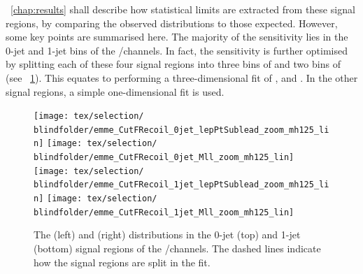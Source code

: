 \Chapter~\ref{chap:results} shall describe how statistical limits are extracted from these 
signal regions, by comparing the observed \mt distributions to those expected. However, some 
key points are summarised here. The majority of the sensitivity lies in the 0-jet and 1-jet 
bins of the \emch/\mech channels. In fact, the sensitivity is further optimised by splitting 
each of these four signal regions into three bins of \ptsubleadlep and two bins of \mll 
(see \Figure~\ref{fig:sel:df_split_sr}). This equates to performing a three-dimensional fit 
of \mt, \mll and \ptsubleadlep. In the other signal regions, a simple one-dimensional \mt 
fit is used.

\begin{figure}[p]
	\texttt{[image: tex/selection/\\blindfolder/emme\_CutFRecoil\_0jet\_lepPtSublead\_zoom\_mh125\_lin]}
	\hfill
	\texttt{[image: tex/selection/\\blindfolder/emme\_CutFRecoil\_0jet\_Mll\_zoom\_mh125\_lin]}
	\\
	\texttt{[image: tex/selection/\\blindfolder/emme\_CutFRecoil\_1jet\_lepPtSublead\_zoom\_mh125\_lin]}
	\hfill
	\texttt{[image: tex/selection/\\blindfolder/emme\_CutFRecoil\_1jet\_Mll\_zoom\_mh125\_lin]}
	\caption{The \ptsubleadlep (left) and \mll (right) distributions in the 0-jet (top) and 
	1-jet (bottom) signal regions of the \emch/\mech channels. The dashed lines indicate 
	how the signal regions are split in the fit.}
	\label{fig:sel:df_split_sr}
\end{figure}


